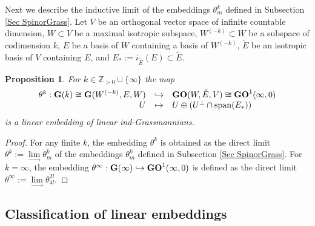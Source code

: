 \documentclass[12pt]{amsart}
\def\ZZ {{\mathbb Z}}     %
\def\hw  {\hookrightarrow}
\newtheorem{prop}[theorem]{Proposition}
\begin{document}
Next we describe the inductive limit of the embeddings $\theta_m^k$ defined in Subsection \ref{Sec SpinorGrass}. Let $V$ be an orthogonal vector space of infinite countable dimension, $W\subset V$ be a maximal isotropic subspace, $W^{(-k)}\subset W$ be a subspace of codimension $k$, $E$ be a basis of $W$ containing a basis of $W^{(-k)}$, $\tilde E$ be an isotropic basis of $V$ containing $E$, and $E_*:=i_{\tilde E}(E)\subset \tilde E$.

\begin{prop}\label{Prop Ind theta}
For $k\in\ZZ_{>0}\cup\{\infty\}$ the map 
\begin{gather*}
\begin{array}{rcl}
\theta^k :{\bf G}(k)\cong {\bf G}(W^{(-k)},E,W) & \hookrightarrow & {\bf GO}(W,\tilde E,V)\cong {\bf GO}^1(\infty,0)\\
 U & \mapsto & U\oplus (U^\perp\cap {\rm span}(E_*))
\end{array}
\end{gather*}
is a linear embedding of linear ind-Grassmannians.
\end{prop}

\begin{proof}
For any finite $k$, the embedding $\theta^k$ is obtained as the direct limit $\theta^k:=\lim\limits_{\to} \theta^k_m$ of the embeddings $\theta^k_m$ defined in Subsection \ref{Sec SpinorGrass}. For $k=\infty$, the embedding $\theta^\infty:{\bf G}(\infty)\hw {\bf GO}^1(\infty,0)$ is defined as the direct limit $\theta^\infty:=\lim\limits_{\to} \theta^{2l}_{4l}$.
\end{proof}


\subsection{Classification of linear embeddings}
\end{document}
